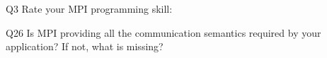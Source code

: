\begin{description}%
\item{Q3} Rate your MPI programming skill:%
\item{Q26} Is MPI providing all the communication semantics required by your application? If not, what is missing?%
\end{description}%
